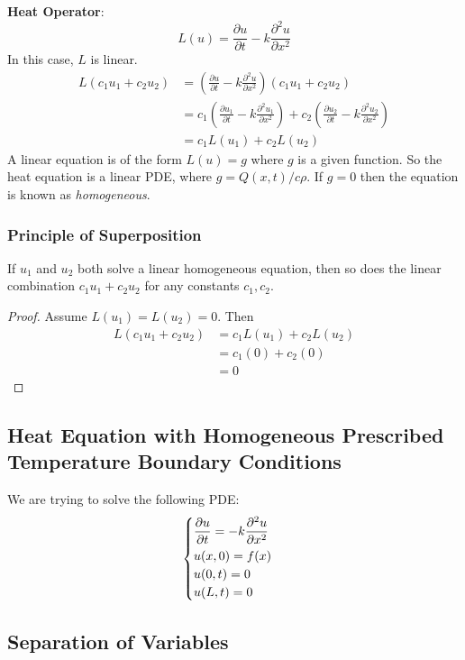 \documentclass{article}
\begin{document}
	\textbf{Heat Operator}:
	\[
		L(u) = \frac{\partial u}{\partial t} - k\frac{\partial^2 u}{\partial x^2}
	\]
	In this case, $ L $ is linear.
	\begin{align*}
		L(c_1 u_1 + c_2 u_2) &= \left( \frac{\partial u}{\partial t} - k\frac{\partial^2 u}{\partial x^2} \right) (c_1 u_1 + c_2 u_2) \\
		&= c_1 \left( \frac{\partial u_1}{\partial t} - k\frac{\partial^2 u_1}{\partial x^2} \right) + c_2 \left( \frac{\partial u_2}{\partial t} - k\frac{\partial^2 u_2}{\partial x^2} \right) \\
		&= c_1 L(u_1) + c_2 L(u_2)
	\end{align*}
	A linear equation is of the form $ L(u)=g $ where $ g $ is a given function. So the heat equation is a linear PDE, where $ g = Q(x,t)/c\rho $. If $ g=0 $ then the equation is known as \textit{homogeneous}.
	
	\subsubsection*{Principle of Superposition}
	
	If $ u_1 $ and $ u_2 $ both solve a linear homogeneous equation, then so does the linear combination $ c_1 u_1 + c_2 u_2 $ for any constants $ c_1,c_2 $.
	\begin{proof}
		Assume $ L(u_1) = L(u_2) = 0 $. Then
		\begin{align*}
			L(c_1 u_1 + c_2 u_2) &= c_1 L(u_1) + c_2 L(u_2) \\
			&= c_1 (0) + c_2(0) \\
			&= 0
		\end{align*}
	\end{proof}

	\subsection{Heat Equation with Homogeneous Prescribed Temperature Boundary Conditions}
	
	We are trying to solve the following PDE:
	\[
		\begin{cases}
			\dfrac{\partial u}{\partial t} = -k\dfrac{\partial^2 u}{\partial x^2} \vspace{1mm} \\
			u(x,0) = f(x) \\
			u(0,t) = 0 \\
			u(L,t) = 0
		\end{cases}
	\]
	
	\subsection*{Separation of Variables}
	
\end{document}
